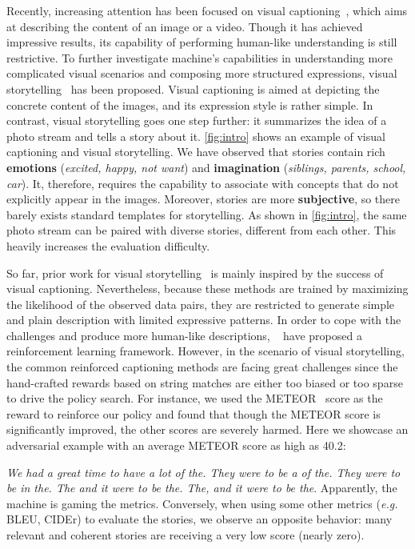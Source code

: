 \documentclass[11pt,a4paper]{article}
\newenvironment{myquote}[1]{\list{}{\leftmargin=#1\rightmargin=#1}\item[]}{\endlist}
\begin{document}
Recently, increasing attention has been focused on visual captioning~\cite{chen2015microsoft,chen2016bootstrap,Xu:CVPR16,wang2018watch}, which aims at describing the content of an image or a video. 
Though it has achieved impressive results, its capability of performing human-like understanding is still restrictive. 
To further investigate machine's capabilities in understanding more complicated visual scenarios and composing more structured expressions, visual storytelling~\cite{huang2016visual} has been proposed.
Visual captioning is aimed at depicting the concrete content of the images, and its expression style is rather simple. In contrast, visual storytelling goes one step further: it summarizes the idea of a photo stream and tells a story about it. 
\autoref{fig:intro} shows an example of visual captioning and visual storytelling. We have observed that stories contain rich \textbf{emotions} (\textit{excited, happy, not want}) and \textbf{imagination} (\textit{siblings, parents, school, car}). It, therefore, requires the capability to associate with concepts that do not explicitly appear in the images. Moreover, stories are more \textbf{subjective}, so there barely exists standard templates for storytelling. As shown in \autoref{fig:intro}, the same photo stream can be paired with diverse stories, different from each other. This heavily increases the evaluation difficulty.  

So far, prior work for visual storytelling~\cite{huang2016visual,yu-bansal-berg:2017:EMNLP2017} is mainly inspired by the success of visual captioning. 
Nevertheless, because these methods are trained by maximizing the likelihood of the observed data pairs, they are restricted to generate simple and plain description with limited expressive patterns. In order to cope with the challenges and produce more human-like descriptions, ~\citet{rennie2016self} have proposed a reinforcement learning framework. However, in the scenario of visual storytelling, the common reinforced captioning methods are facing great challenges since the hand-crafted rewards based on string matches are either too biased or too sparse to drive the policy search. For instance, we used the METEOR~\cite{banerjee2005meteor} score as the reward to reinforce our policy and found that though the METEOR score is significantly improved, the other scores are severely harmed. Here we showcase an adversarial example with an average METEOR score as high as 40.2:
\begin{myquote}{0.2in}
\textit{We had a great time to have a lot of the. They were to be a of the. They were to be in the. The and it were to be the. The, and it were to be the}. 
\end{myquote}
Apparently, the machine is gaming the metrics. Conversely, when using some other metrics (\textit{e.g.} BLEU, CIDEr) to evaluate the stories, we observe an opposite behavior: many relevant and coherent stories are receiving a very low score (nearly zero). 
\end{document}
